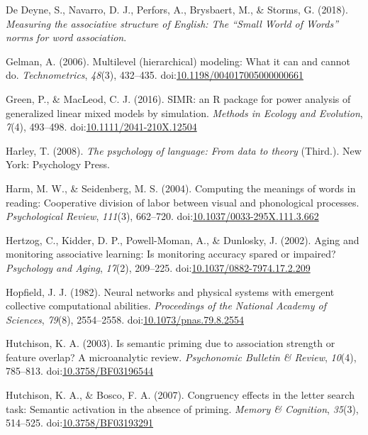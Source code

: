 \documentclass[english,,man]{apa6}
\begin{document}
\hypertarget{ref-DeDeyne2018}{}
De Deyne, S., Navarro, D. J., Perfors, A., Brysbaert, M., \& Storms, G.
(2018). \emph{Measuring the associative structure of English: The
``Small World of Words'' norms for word association}.

\hypertarget{ref-Gelman2006}{}
Gelman, A. (2006). Multilevel (hierarchical) modeling: What it can and
cannot do. \emph{Technometrics}, \emph{48}(3), 432--435.
doi:\href{https://doi.org/10.1198/004017005000000661}{10.1198/004017005000000661}

\hypertarget{ref-Green2016}{}
Green, P., \& MacLeod, C. J. (2016). SIMR: an R package for power
analysis of generalized linear mixed models by simulation. \emph{Methods
in Ecology and Evolution}, \emph{7}(4), 493--498.
doi:\href{https://doi.org/10.1111/2041-210X.12504}{10.1111/2041-210X.12504}

\hypertarget{ref-Harley2008}{}
Harley, T. (2008). \emph{The psychology of language: From data to
theory} (Third.). New York: Psychology Press.

\hypertarget{ref-Harm2004}{}
Harm, M. W., \& Seidenberg, M. S. (2004). Computing the meanings of
words in reading: Cooperative division of labor between visual and
phonological processes. \emph{Psychological Review}, \emph{111}(3),
662--720.
doi:\href{https://doi.org/10.1037/0033-295X.111.3.662}{10.1037/0033-295X.111.3.662}

\hypertarget{ref-Hertzog2002}{}
Hertzog, C., Kidder, D. P., Powell-Moman, A., \& Dunlosky, J. (2002).
Aging and monitoring associative learning: Is monitoring accuracy spared
or impaired? \emph{Psychology and Aging}, \emph{17}(2), 209--225.
doi:\href{https://doi.org/10.1037/0882-7974.17.2.209}{10.1037/0882-7974.17.2.209}

\hypertarget{ref-Hopfield1982}{}
Hopfield, J. J. (1982). Neural networks and physical systems with
emergent collective computational abilities. \emph{Proceedings of the
National Academy of Sciences}, \emph{79}(8), 2554--2558.
doi:\href{https://doi.org/10.1073/pnas.79.8.2554}{10.1073/pnas.79.8.2554}

\hypertarget{ref-Hutchison2003}{}
Hutchison, K. A. (2003). Is semantic priming due to association strength
or feature overlap? A microanalytic review. \emph{Psychonomic Bulletin
\& Review}, \emph{10}(4), 785--813.
doi:\href{https://doi.org/10.3758/BF03196544}{10.3758/BF03196544}

\hypertarget{ref-Hutchison2007}{}
Hutchison, K. A., \& Bosco, F. A. (2007). Congruency effects in the
letter search task: Semantic activation in the absence of priming.
\emph{Memory \& Cognition}, \emph{35}(3), 514--525.
doi:\href{https://doi.org/10.3758/BF03193291}{10.3758/BF03193291}
\end{document}
